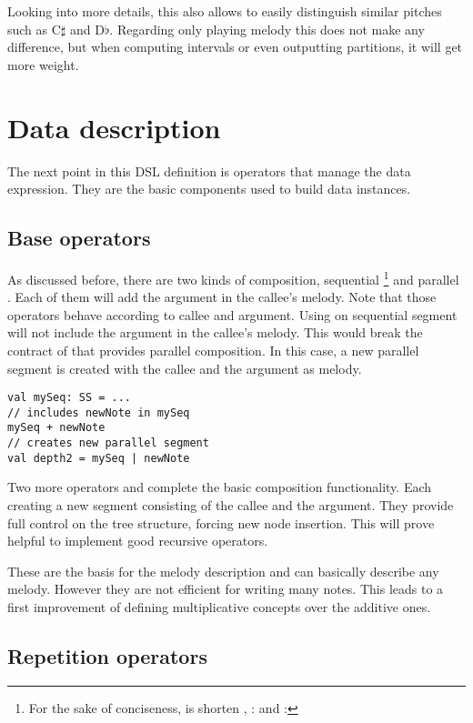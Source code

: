 \documentclass[twocolumn, 11pt]{article}
\begin{document}
Looking into more details, this also allows to easily distinguish similar pitches such as C$\sharp$ and D$\flat$. Regarding only playing melody this does not make any difference, but when computing intervals or even outputting partitions, it will get more weight.

\section{Data description}

The next point in this DSL definition is operators that manage the data expression.
They are the basic components used to build data instances.


\subsection{Base operators}

As discussed before, there are two kinds of composition, sequential \footnote{For the sake of conciseness,  is shorten ,  :  and  : } and parallel . Each of them will add the  argument in the callee's melody. Note that those operators behave according to callee and argument. Using \lln{|} on sequential segment will not include the argument in the callee's melody. This would break the contract of \lln{|} that provides parallel composition. In this case, a new parallel segment is created with the callee and the argument as melody.
\begin{lstlisting}
val mySeq: SS = ...
// includes newNote in mySeq
mySeq + newNote
// creates new parallel segment
val depth2 = mySeq | newNote
\end{lstlisting}

Two more operators  and  complete the basic composition functionality. Each creating a new segment consisting of the callee and the argument. They provide full control on the tree structure, forcing new node insertion. This will prove helpful to implement good recursive operators.

These are the basis for the melody description and can basically describe any melody. However they are not efficient for writing many notes. This leads to a first improvement of defining multiplicative concepts over the additive ones.

\subsection{Repetition operators}
\end{document}
